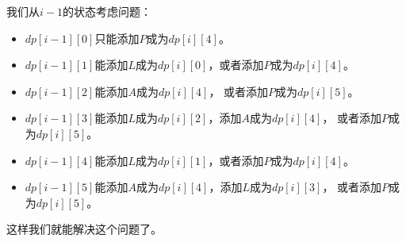 \documentclass[../../main.tex]{subfiles}
\begin{document}
我们从$i - 1$的状态考虑问题：

\begin{itemize}
  \item $dp[i-1][0]$只能添加$P$成为$dp[i][4]$。
  \item $dp[i-1][1]$能添加$L$成为$dp[i][0]$，或者添加$P$成为$dp[i][4]$。
  \item $dp[i-1][2]$能添加$A$成为$dp[i][4]$， 或者添加$P$成为$dp[i][5]$。
  \item $dp[i-1][3]$能添加$L$成为$dp[i][2]$，添加$A$成为$dp[i][4]$，
  或者添加$P$成为$dp[i][5]$。
  \item $dp[i-1][4]$能添加$L$成为$dp[i][1]$，或者添加$P$成为$dp[i][4]$。
  \item $dp[i-1][5]$能添加$A$成为$dp[i][4]$，添加$L$成为$dp[i][3]$，
  或者添加$P$成为$dp[i][5]$。
\end{itemize}

这样我们就能解决这个问题了。


\end{document}
